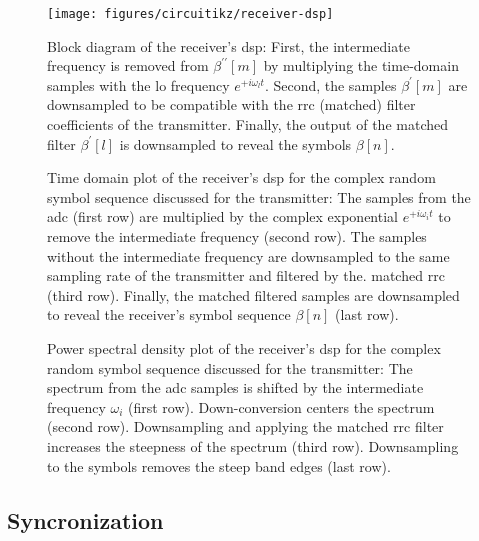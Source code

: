 \begin{figure}[htb]
	\centering
	\texttt{[image: figures/circuitikz/receiver-dsp]}
	\caption{Block diagram of the receiver's \gls{dsp}: First, the intermediate frequency is removed from $\beta^{\prime\prime}[m]$ by multiplying the time-domain samples with the \gls{lo} frequency $e^{+i\omega_lt}$. Second, the samples $\beta^\prime[m]$ are downsampled to be compatible with the \gls{rrc} (matched) filter coefficients of the transmitter. Finally, the output of the matched filter $\beta^\prime[l]$ is downsampled to reveal the symbols $\beta[n]$.}
\end{figure}

\begin{figure}[htb]
	\centering
	
	\caption{Time domain plot of the receiver's \gls{dsp} for the complex random symbol sequence discussed for the transmitter: The samples from the \gls{adc} (first row) are multiplied by the complex exponential $e^{+i\omega_it}$ to remove the intermediate frequency (second row). The samples without the intermediate frequency are downsampled to the same sampling rate of the transmitter and filtered by the. matched \gls{rrc} (third row). Finally, the matched filtered samples are downsampled to reveal the receiver's symbol sequence $\beta[n]$ (last row).}
\end{figure}

\begin{figure}[htb]
	\centering
	
	\caption{Power spectral density plot of the receiver's \gls{dsp} for the complex random symbol sequence discussed for the transmitter: The spectrum from the \gls{adc} samples is shifted by the intermediate frequency $\omega_i$ (first row). Down-conversion centers the spectrum (second row). Downsampling and applying the matched \gls{rrc} filter increases the steepness of the spectrum (third row). Downsampling to the symbols removes the steep band edges (last row).}
\end{figure}

\FloatBarrier
\subsection{Syncronization}


